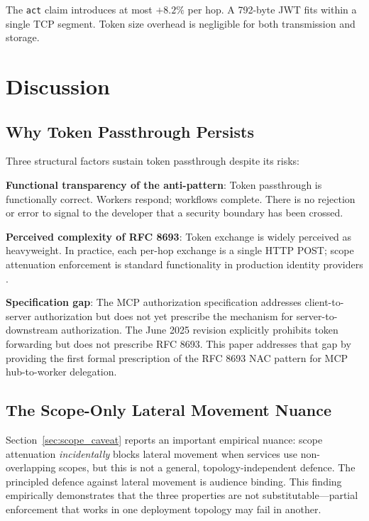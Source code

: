 \documentclass[journal]{IEEEtran}
\begin{document}
The \texttt{act} claim introduces at most $+8.2\%$ per hop. A 792-byte JWT
fits within a single TCP segment. Token size overhead is negligible for both
transmission and storage.


\section{Discussion}
\label{sec:discussion}

\subsection{Why Token Passthrough Persists}

Three structural factors sustain token passthrough despite its risks:

\textbf{Functional transparency of the anti-pattern}: Token passthrough is
functionally correct. Workers respond; workflows complete. There is no rejection
or error to signal to the developer that a security boundary has been crossed.

\textbf{Perceived complexity of RFC 8693}: Token exchange is widely perceived
as heavyweight. In practice, each per-hop exchange is a single HTTP POST;
scope attenuation enforcement is standard functionality in production identity
providers \cite{rfc8693_deploy}.

\textbf{Specification gap}: The MCP authorization specification
\cite{mcp_spec_2025} addresses client-to-server authorization but does not yet
prescribe the mechanism for server-to-downstream authorization. The June 2025
revision explicitly prohibits token forwarding but does not prescribe RFC 8693.
This paper addresses that gap by providing the first formal prescription of the
RFC 8693 NAC pattern for MCP hub-to-worker delegation.

\subsection{The Scope-Only Lateral Movement Nuance}

Section~\ref{sec:scope_caveat} reports an important empirical nuance: scope
attenuation \textit{incidentally} blocks lateral movement when services use
non-overlapping scopes, but this is not a general, topology-independent defence.
The principled defence against lateral movement is audience binding. This
finding empirically demonstrates that the three properties are not
substitutable---partial enforcement that works in one deployment topology may fail
in another.
\end{document}
